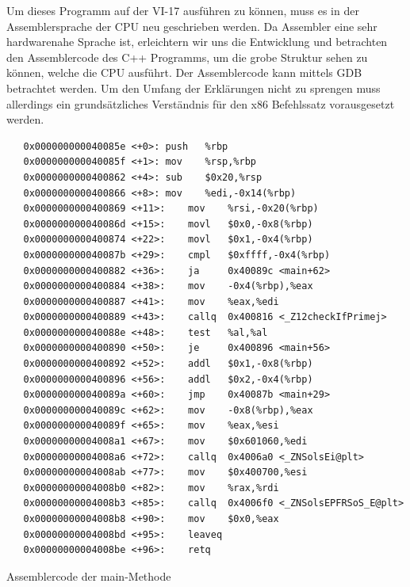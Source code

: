 \documentclass[12pt]{article}
\begin{document}
\par\bigskip\noindent Um dieses Programm auf der VI-17 ausführen zu können, muss es in der Assemblersprache der CPU neu geschrieben werden. Da Assembler eine sehr hardwarenahe Sprache ist, erleichtern wir uns die Entwicklung und betrachten den Assemblercode des C++ Programms, um die grobe Struktur sehen zu können, welche die CPU ausführt. Der Assemblercode kann mittels GDB betrachtet werden. Um den Umfang der Erklärungen nicht zu sprengen muss allerdings ein grundsätzliches Verständnis für den x86 Befehlssatz vorausgesetzt werden.
\newpage


\begin{code}
\begin{lstlisting}
   0x000000000040085e <+0>:	push   %rbp
   0x000000000040085f <+1>:	mov    %rsp,%rbp
   0x0000000000400862 <+4>:	sub    $0x20,%rsp
   0x0000000000400866 <+8>:	mov    %edi,-0x14(%rbp)
   0x0000000000400869 <+11>:	mov    %rsi,-0x20(%rbp)
   0x000000000040086d <+15>:	movl   $0x0,-0x8(%rbp)
   0x0000000000400874 <+22>:	movl   $0x1,-0x4(%rbp)
   0x000000000040087b <+29>:	cmpl   $0xffff,-0x4(%rbp)
   0x0000000000400882 <+36>:	ja     0x40089c <main+62>
   0x0000000000400884 <+38>:	mov    -0x4(%rbp),%eax
   0x0000000000400887 <+41>:	mov    %eax,%edi
   0x0000000000400889 <+43>:	callq  0x400816 <_Z12checkIfPrimej>
   0x000000000040088e <+48>:	test   %al,%al
   0x0000000000400890 <+50>:	je     0x400896 <main+56>
   0x0000000000400892 <+52>:	addl   $0x1,-0x8(%rbp)
   0x0000000000400896 <+56>:	addl   $0x2,-0x4(%rbp)
   0x000000000040089a <+60>:	jmp    0x40087b <main+29>
   0x000000000040089c <+62>:	mov    -0x8(%rbp),%eax
   0x000000000040089f <+65>:	mov    %eax,%esi
   0x00000000004008a1 <+67>:	mov    $0x601060,%edi
   0x00000000004008a6 <+72>:	callq  0x4006a0 <_ZNSolsEi@plt>
   0x00000000004008ab <+77>:	mov    $0x400700,%esi
   0x00000000004008b0 <+82>:	mov    %rax,%rdi
   0x00000000004008b3 <+85>:	callq  0x4006f0 <_ZNSolsEPFRSoS_E@plt>
   0x00000000004008b8 <+90>:	mov    $0x0,%eax
   0x00000000004008bd <+95>:	leaveq 
   0x00000000004008be <+96>:	retq   
\end{lstlisting}
\caption[Assemblercode der main Methode]{Assemblercode der main-Methode}
\end{code}
\end{document}

